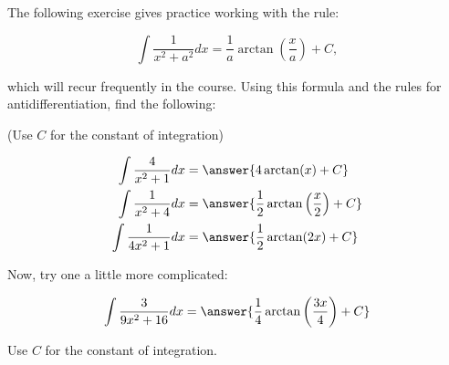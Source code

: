\documentclass{ximera}
\author{Jim Talamo}
\begin{document}
\begin{exercise}
The following exercise gives practice working with the rule: 

\[\int \frac{1}{x^2+a^2} dx = \frac{1}{a} \arctan\left(\frac{x}{a}\right) +C, \]

which will recur frequently in the course.  Using this formula and the rules for antidifferentiation, find the following:

\begin{prompt} (Use $C$ for the constant of integration) \end{prompt}

\begin{align*}
\int \frac{4}{x^2+1} dx &= \answer{4\arctan(x)+C}\\
\int \frac{1}{x^2+4} dx &= \answer{\frac{1}{2}\arctan\left(\frac{x}{2}\right)+C}\\
\int \frac{1}{4x^2+1} dx &= \answer{\frac{1}{2} \arctan(2x)+C}\\
\end{align*}

Now, try one a little more complicated:

\[ \int \frac{3}{9x^2+16} dx = \answer{\frac{1}{4}\arctan\left(\frac{3x}{4}\right)+C} \]

\begin{prompt} Use $C$ for the constant of integration. \end{prompt}
\end{exercise}
\end{document}
